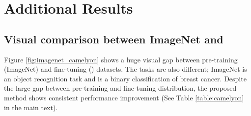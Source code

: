 

\section{Additional Results}

\subsection{Visual comparison between ImageNet and }
\label{subsec:imagenet_vs_camelyon17}



Figure \ref{fig:imagenet_camelyon} shows a huge visual gap between pre-training (ImageNet) and fine-tuning () datasets. The tasks are also different; ImageNet is an object recognition task and  is a binary classification of breast cancer. Despite the large gap between pre-training and fine-tuning distribution, the proposed method shows consistent performance improvement (See Table \ref{table:camelyon} in the main text).


